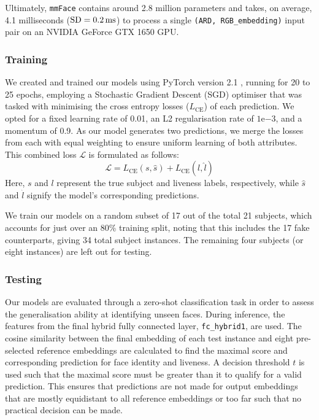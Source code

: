 \documentclass{mpaper}
\begin{document}
Ultimately, \texttt{mmFace} contains around 2.8 million parameters and takes, on average, 4.1 milliseconds ($\text{SD}=\text{\qty{0.2}{\ms}}$) to process a single \texttt{(ARD, RGB\_embedding)} input pair on an NVIDIA GeForce GTX 1650 GPU.

\subsubsection{Training}
We created and trained our models using PyTorch version 2.1 \cite{paszke2019pytorch}, running for 20 to 25 epochs, employing a Stochastic Gradient Descent (SGD) optimiser that was tasked with minimising the cross entropy losses ($L_{\text{CE}}$) of each prediction. We opted for a fixed learning rate of 0.01, an L2 regularisation rate of $1\mathrm{e}{-3}$, and a momentum of 0.9. As our model generates two predictions, we merge the losses from each with equal weighting to ensure uniform learning of both attributes. This combined loss $\mathcal{L}$ is formulated as follows:
$$\mathcal{L} = L_{\text{CE}}(s, \hat{s}) + L_{\text{CE}}(l, \hat{l})$$
Here, $s$ and $l$ represent the true subject and liveness labels, respectively, while $\hat{s}$ and $\hat{l}$ signify the model's corresponding predictions. 

We train our models on a random subset of 17 out of the total 21 subjects, which accounts for just over an 80\% training split, noting that this includes the 17 fake counterparts, giving 34 total subject instances. The remaining four subjects (or eight instances) are left out for testing.

\subsubsection{Testing}
Our models are evaluated through a zero-shot classification task in order to assess the generalisation ability at identifying unseen faces. During inference, the features from the final hybrid fully connected layer, \texttt{fc\_hybrid1}, are used. The cosine similarity between the final embedding of each test instance and eight pre-selected reference embeddings are calculated to find the maximal score and corresponding prediction for face identity and liveness. A decision threshold $t$ is used such that the maximal score must be greater than it to qualify for a valid prediction. This ensures that predictions are not made for output embeddings that are mostly equidistant to all reference embeddings or too far such that no practical decision can be made.
\end{document}
